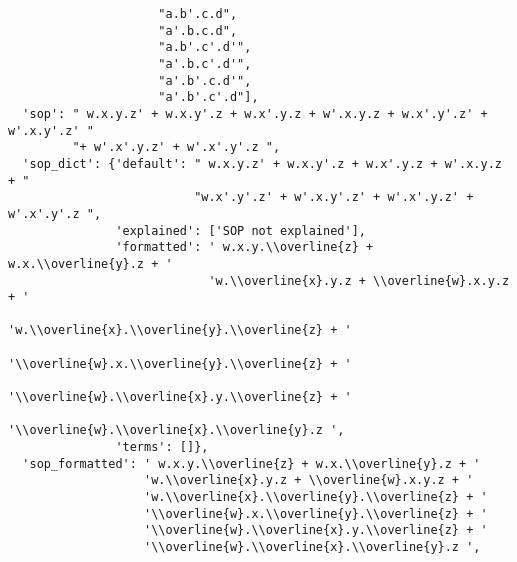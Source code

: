 \begin{verbatim}
                     "a.b'.c.d",
                     "a'.b.c.d",
                     "a.b'.c'.d'",
                     "a'.b.c'.d'",
                     "a'.b'.c.d'",
                     "a'.b'.c'.d"],
  'sop': " w.x.y.z' + w.x.y'.z + w.x'.y.z + w'.x.y.z + w.x'.y'.z' + w'.x.y'.z' "
         "+ w'.x'.y.z' + w'.x'.y'.z ",
  'sop_dict': {'default': " w.x.y.z' + w.x.y'.z + w.x'.y.z + w'.x.y.z + "
                          "w.x'.y'.z' + w'.x.y'.z' + w'.x'.y.z' + w'.x'.y'.z ",
               'explained': ['SOP not explained'],
               'formatted': ' w.x.y.\\overline{z} + w.x.\\overline{y}.z + '
                            'w.\\overline{x}.y.z + \\overline{w}.x.y.z + '
                            'w.\\overline{x}.\\overline{y}.\\overline{z} + '
                            '\\overline{w}.x.\\overline{y}.\\overline{z} + '
                            '\\overline{w}.\\overline{x}.y.\\overline{z} + '
                            '\\overline{w}.\\overline{x}.\\overline{y}.z ',
               'terms': []},
  'sop_formatted': ' w.x.y.\\overline{z} + w.x.\\overline{y}.z + '
                   'w.\\overline{x}.y.z + \\overline{w}.x.y.z + '
                   'w.\\overline{x}.\\overline{y}.\\overline{z} + '
                   '\\overline{w}.x.\\overline{y}.\\overline{z} + '
                   '\\overline{w}.\\overline{x}.y.\\overline{z} + '
                   '\\overline{w}.\\overline{x}.\\overline{y}.z ',

\end{verbatim}
